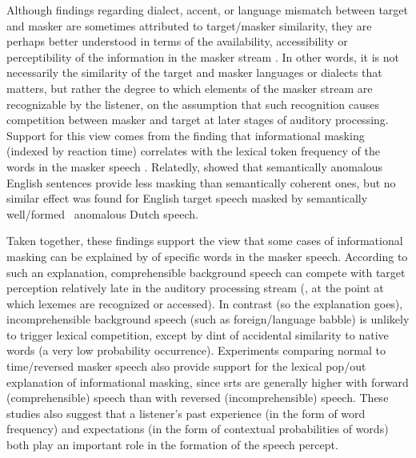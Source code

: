 Although findings regarding dialect, accent, or language mismatch between target and masker are sometimes attributed to target\-/masker similarity, they are perhaps better understood in terms of the availability, accessibility or perceptibility of the information in the masker stream \citep{VanEngenBradlow2007, CalandruccioEtAl2010, BrouwerEtAl2012}.  In other words, it is not necessarily the similarity of the target and masker languages or dialects that matters, but rather the degree to which elements of the masker stream are recognizable by the listener, on the assumption that such recognition causes competition between masker and target at later stages of auditory processing.  Support for this view comes from the finding that informational masking (indexed by reaction time) correlates with the lexical token frequency of the words in the masker speech \citep{BoulengerEtAl2010}.  Relatedly, \citet{BrouwerEtAl2012} showed that semantically anomalous English sentences provide less masking than semantically coherent ones, but no similar effect was found for English target speech masked by semantically well\-/formed \vs\ anomalous Dutch speech.  

Taken together, these findings support the view that some cases of informational masking can be explained by  of specific words in the masker speech.  According to such an explanation, comprehensible background speech can compete with target perception relatively late in the auditory processing stream (\ie, at the point at which lexemes are recognized or accessed).  In contrast (so the explanation goes), incomprehensible background speech (such as foreign\-/language babble) is unlikely to trigger lexical competition, except by dint of accidental similarity to native words (a very low probability occurrence).  Experiments comparing normal to time\-/reversed masker speech also provide support for the lexical pop\-/out explanation of informational masking, since \ac{srt}s are generally higher with forward (comprehensible) speech than with reversed (incomprehensible) speech.\footnotemark{}  These studies also suggest that a listener’s past experience (in the form of word frequency) and expectations (in the form of contextual probabilities of words) both play an important role in the formation of the speech percept.

